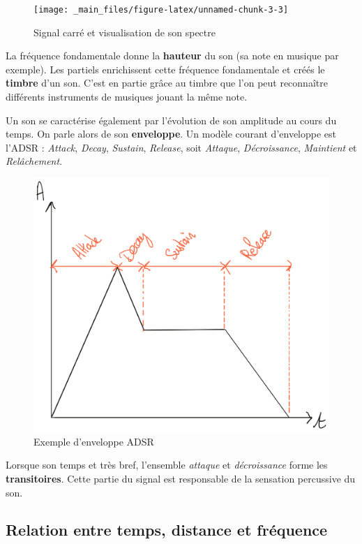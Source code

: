 \documentclass[
]{book}
\begin{document}
\begin{figure}

{\centering \texttt{[image: \_main\_files/figure-latex/unnamed-chunk-3-3]} 

}

\caption{Signal carré et visualisation de son spectre}\label{fig:unnamed-chunk-3}
\end{figure}

La fréquence fondamentale donne la \textbf{hauteur} du son (sa note en musique par exemple). Les partiels enrichissent cette fréquence fondamentale et créés le \textbf{timbre} d'un son. C'est en partie grâce au timbre que l'on peut reconnaître différents instruments de musiques jouant la même note.

Un son se caractérise également par l'évolution de son amplitude au cours du temps. On parle alors de son \textbf{enveloppe}. Un modèle courant d'enveloppe est l'ADSR : \emph{Attack}, \emph{Decay}, \emph{Sustain}, \emph{Release}, soit \emph{Attaque}, \emph{Décroissance}, \emph{Maintient} et \emph{Relâchement}.

\begin{figure}

{\centering \includegraphics[width=0.65\linewidth]{_resources/drawings/adsr} 

}

\caption{Exemple d'enveloppe ADSR}\label{fig:unnamed-chunk-4}
\end{figure}

Lorsque son temps et très bref, l'ensemble \emph{attaque} et \emph{décroissance} forme les \textbf{transitoires}. Cette partie du signal est responsable de la sensation percussive du son.

\hypertarget{relation-entre-temps-distance-et-fruxe9quence}{%
\subsection{Relation entre temps, distance et fréquence}\label{relation-entre-temps-distance-et-fruxe9quence}}
\end{document}
